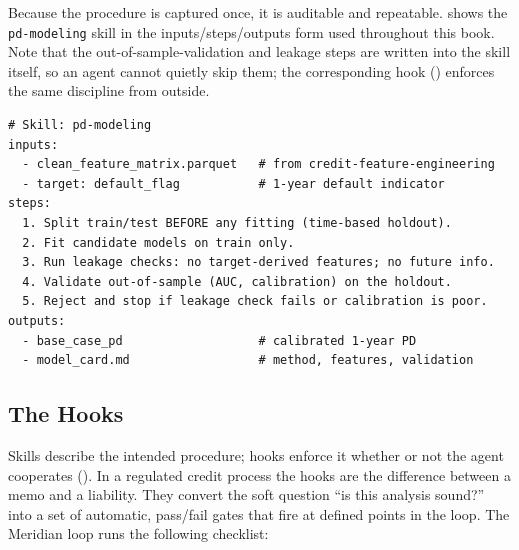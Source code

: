 Because the procedure is captured once, it is auditable and repeatable.
 shows the \texttt{pd-modeling} skill in the
inputs/steps/outputs form used throughout this book. Note that the
out-of-sample-validation and leakage steps are written into the skill itself, so an
agent cannot quietly skip them; the corresponding hook ()
enforces the same discipline from outside.

\begin{listing}[t]
\begin{verbatim}
# Skill: pd-modeling
inputs:
  - clean_feature_matrix.parquet   # from credit-feature-engineering
  - target: default_flag           # 1-year default indicator
steps:
  1. Split train/test BEFORE any fitting (time-based holdout).
  2. Fit candidate models on train only.
  3. Run leakage checks: no target-derived features; no future info.
  4. Validate out-of-sample (AUC, calibration) on the holdout.
  5. Reject and stop if leakage check fails or calibration is poor.
outputs:
  - base_case_pd                   # calibrated 1-year PD
  - model_card.md                  # method, features, validation
\end{verbatim}
\caption{The \texttt{pd-modeling} skill. The train/test split, leakage check, and
out-of-sample validation are part of the procedure, not optional add-ons, so every
invocation inherits the same discipline.}
\label{lst:pd-skill}
\end{listing}

\subsection{The Hooks}\label{subsec:credit-hooks}

Skills describe the intended procedure; hooks enforce it whether or not the agent
cooperates (). In a regulated credit process the hooks
are the difference between a memo and a liability. They convert the soft question
``is this analysis sound?'' into a set of automatic, pass/fail gates that fire at
defined points in the loop. The Meridian loop runs the following checklist:

